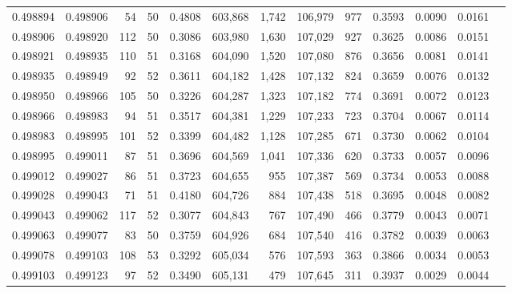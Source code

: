 \begin{tabular}{rrrrrrrrrrrrr}
0.498894 & 0.498906 &    54 &  50 &                                     0.4808 & 603,868 &   1,742 & 106,979 &     977 & 0.3593 & 0.0090 & 0.0161 \\
0.498906 & 0.498920 &   112 &  50 &                                     0.3086 & 603,980 &   1,630 & 107,029 &     927 & 0.3625 & 0.0086 & 0.0151 \\
0.498921 & 0.498935 &   110 &  51 &                                     0.3168 & 604,090 &   1,520 & 107,080 &     876 & 0.3656 & 0.0081 & 0.0141 \\
0.498935 & 0.498949 &    92 &  52 &                                     0.3611 & 604,182 &   1,428 & 107,132 &     824 & 0.3659 & 0.0076 & 0.0132 \\
0.498950 & 0.498966 &   105 &  50 &                                     0.3226 & 604,287 &   1,323 & 107,182 &     774 & 0.3691 & 0.0072 & 0.0123 \\
0.498966 & 0.498983 &    94 &  51 &                                     0.3517 & 604,381 &   1,229 & 107,233 &     723 & 0.3704 & 0.0067 & 0.0114 \\
0.498983 & 0.498995 &   101 &  52 &                                     0.3399 & 604,482 &   1,128 & 107,285 &     671 & 0.3730 & 0.0062 & 0.0104 \\
0.498995 & 0.499011 &    87 &  51 &                                     0.3696 & 604,569 &   1,041 & 107,336 &     620 & 0.3733 & 0.0057 & 0.0096 \\
0.499012 & 0.499027 &    86 &  51 &                                     0.3723 & 604,655 &     955 & 107,387 &     569 & 0.3734 & 0.0053 & 0.0088 \\
0.499028 & 0.499043 &    71 &  51 &                                     0.4180 & 604,726 &     884 & 107,438 &     518 & 0.3695 & 0.0048 & 0.0082 \\
0.499043 & 0.499062 &   117 &  52 &                                     0.3077 & 604,843 &     767 & 107,490 &     466 & 0.3779 & 0.0043 & 0.0071 \\
0.499063 & 0.499077 &    83 &  50 &                                     0.3759 & 604,926 &     684 & 107,540 &     416 & 0.3782 & 0.0039 & 0.0063 \\
0.499078 & 0.499103 &   108 &  53 &                                     0.3292 & 605,034 &     576 & 107,593 &     363 & 0.3866 & 0.0034 & 0.0053 \\
0.499103 & 0.499123 &    97 &  52 &                                     0.3490 & 605,131 &     479 & 107,645 &     311 & 0.3937 & 0.0029 & 0.0044 \\

\end{tabular}
